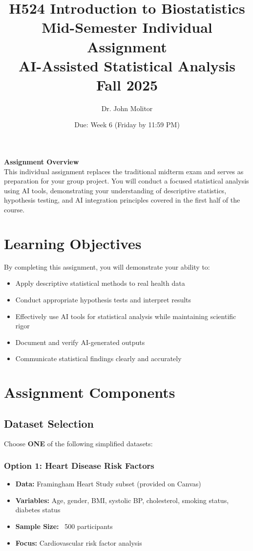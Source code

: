 \documentclass[11pt]{article}
\title{\textbf{H524 Introduction to Biostatistics\\
\Large Mid-Semester Individual Assignment\\
AI-Assisted Statistical Analysis\\
Fall 2025}}
\author{Dr. John Molitor}
\date{Due: Week 6 (Friday by 11:59 PM)}
\begin{document}
\maketitle

\begin{tcolorbox}[colback=aiblue!10,colframe=aiblue,boxrule=2pt,arc=2pt,left=6pt,right=6pt,top=6pt,bottom=6pt]
\centering
\textbf{\large Assignment Overview}\\[0.3em]
This individual assignment replaces the traditional midterm exam and serves as preparation for your group project. You will conduct a focused statistical analysis using AI tools, demonstrating your understanding of descriptive statistics, hypothesis testing, and AI integration principles covered in the first half of the course.
\end{tcolorbox}

\section{Learning Objectives}

By completing this assignment, you will demonstrate your ability to:
\begin{itemize}[leftmargin=20pt]
\item Apply descriptive statistical methods to real health data
\item Conduct appropriate hypothesis tests and interpret results
\item Effectively use AI tools for statistical analysis while maintaining scientific rigor
\item Document and verify AI-generated outputs
\item Communicate statistical findings clearly and accurately
\end{itemize}

\section{Assignment Components}

\subsection{Dataset Selection}
Choose \textbf{ONE} of the following simplified datasets:

\subsubsection{Option 1: Heart Disease Risk Factors}
\begin{itemize}
\item \textbf{Data:} Framingham Heart Study subset (provided on Canvas)
\item \textbf{Variables:} Age, gender, BMI, systolic BP, cholesterol, smoking status, diabetes status
\item \textbf{Sample Size:} ~500 participants
\item \textbf{Focus:} Cardiovascular risk factor analysis
\end{itemize}
\end{document}
